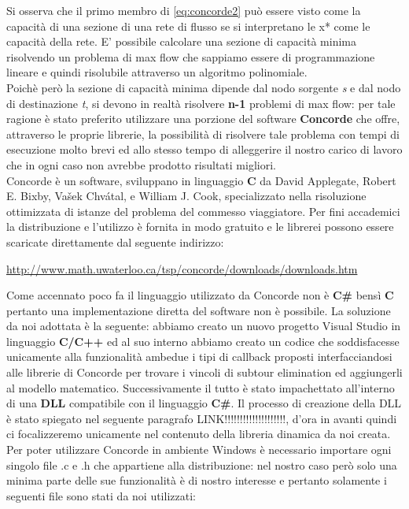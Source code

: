 \documentclass[11pt]{article}
\begin{document}
Si osserva che il primo membro di \eqref{eq:concorde2} può essere visto come la capacità di una sezione di una rete di flusso se si interpretano le x* come le capacità della rete.
E' possibile calcolare una sezione di capacità minima risolvendo un problema di max flow che sappiamo essere di programmazione lineare e quindi risolubile attraverso un algoritmo polinomiale.\\
Poichè però la sezione di capacità minima dipende dal nodo sorgente \textit{s} e dal nodo di destinazione \textit{t}, si devono in realtà risolvere \textbf{n-1} problemi di max flow: per tale ragione è stato preferito utilizzare una porzione del software \textbf{Concorde} che offre, attraverso le proprie librerie, la possibilità di risolvere tale problema con tempi di esecuzione molto brevi ed allo stesso tempo di alleggerire il nostro carico di lavoro che in ogni caso non avrebbe prodotto risultati migliori.\\
Concorde è un software, sviluppano in linguaggio \textbf{C} da David Applegate, Robert E. Bixby, Vašek Chvátal, e William J. Cook, specializzato nella risoluzione ottimizzata di istanze del problema del commesso viaggiatore. Per fini accademici la distribuzione e l'utilizzo è fornita in modo gratuito e le librerei possono essere scaricate direttamente dal seguente indirizzo:
\begin{center}
\href{http://www.math.uwaterloo.ca/tsp/concorde/downloads/downloads.htm}{http://www.math.uwaterloo.ca/tsp/concorde/downloads/downloads.htm}
\end{center}

Come accennato poco fa il linguaggio utilizzato da Concorde non è \textbf{C\#} bensì \textbf{C} pertanto una implementazione diretta del software non è possibile. La soluzione da noi adottata è la seguente: abbiamo creato un nuovo progetto Visual Studio in linguaggio \textbf{C/C++} ed al suo interno abbiamo creato un codice che soddisfacesse unicamente alla funzionalità ambedue i tipi di callback proposti interfacciandosi alle librerie di Concorde per trovare i vincoli di subtour elimination ed aggiungerli al modello matematico. Successivamente il tutto è stato impachettato all'interno di una \textbf{DLL} compatibile con il linguaggio \textbf{C\#}. Il processo di creazione della DLL è stato spiegato nel seguente paragrafo LINK!!!!!!!!!!!!!!!!!!!!, d'ora in avanti quindi ci focalizzeremo unicamente nel contenuto della libreria dinamica da noi creata.\\

Per poter utilizzare Concorde in ambiente Windows è necessario importare ogni singolo file .c e .h che appartiene alla distribuzione: nel nostro caso però solo una minima parte delle sue funzionalità è di nostro interesse e pertanto solamente i seguenti file sono stati da noi utilizzati:
\end{document}
